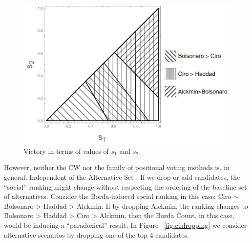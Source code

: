 \documentclass[hidelinks,11pt]{article}
\begin{document}
\begin{figure}[H]
 \centering
 \includegraphics[width=\columnwidth,
 height=0.3\textheight]{./images/counterfactual_triangle.png}
\caption{Victory in terms of values of \(s_{1}\) and \(s_{2}\)}
 \label{fig:positional4c}
\end{figure}


However, neither the CW nor the family of positional voting methods is, in
general, Independent of the Alternative Set \parencite{kaminski2015empirical}.
If we drop or add candidates, the ``social'' ranking might change without
respecting the ordering of the baseline set of alternatives. Consider the
Borda-induced social ranking in this case: Ciro \( \sim \) Bolsonaro > Haddad >
Alckmin. If by dropping Alckmin, the ranking changes to Bolsonaro > Haddad >
Ciro > Alckmin, then the Borda Count, in this case, would be inducing a
``paradoxical'' result. In Figure ~\ref{fig:c1dropping} we consider alternative
scenarios by dropping one of the top 4 candidates.
\end{document}
